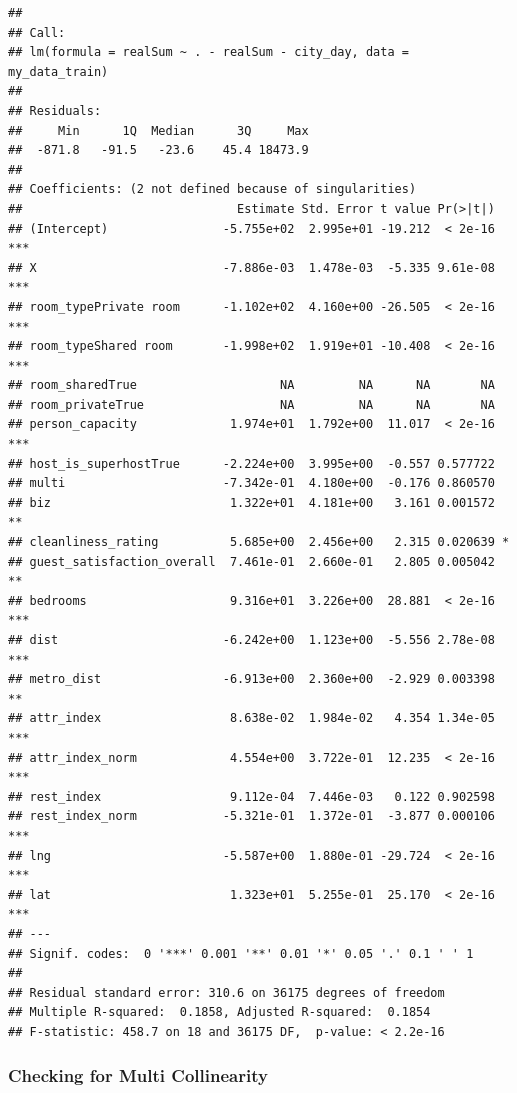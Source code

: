 \documentclass[
]{article}
\begin{document}
\begin{verbatim}
## 
## Call:
## lm(formula = realSum ~ . - realSum - city_day, data = my_data_train)
## 
## Residuals:
##     Min      1Q  Median      3Q     Max 
##  -871.8   -91.5   -23.6    45.4 18473.9 
## 
## Coefficients: (2 not defined because of singularities)
##                              Estimate Std. Error t value Pr(>|t|)    
## (Intercept)                -5.755e+02  2.995e+01 -19.212  < 2e-16 ***
## X                          -7.886e-03  1.478e-03  -5.335 9.61e-08 ***
## room_typePrivate room      -1.102e+02  4.160e+00 -26.505  < 2e-16 ***
## room_typeShared room       -1.998e+02  1.919e+01 -10.408  < 2e-16 ***
## room_sharedTrue                    NA         NA      NA       NA    
## room_privateTrue                   NA         NA      NA       NA    
## person_capacity             1.974e+01  1.792e+00  11.017  < 2e-16 ***
## host_is_superhostTrue      -2.224e+00  3.995e+00  -0.557 0.577722    
## multi                      -7.342e-01  4.180e+00  -0.176 0.860570    
## biz                         1.322e+01  4.181e+00   3.161 0.001572 ** 
## cleanliness_rating          5.685e+00  2.456e+00   2.315 0.020639 *  
## guest_satisfaction_overall  7.461e-01  2.660e-01   2.805 0.005042 ** 
## bedrooms                    9.316e+01  3.226e+00  28.881  < 2e-16 ***
## dist                       -6.242e+00  1.123e+00  -5.556 2.78e-08 ***
## metro_dist                 -6.913e+00  2.360e+00  -2.929 0.003398 ** 
## attr_index                  8.638e-02  1.984e-02   4.354 1.34e-05 ***
## attr_index_norm             4.554e+00  3.722e-01  12.235  < 2e-16 ***
## rest_index                  9.112e-04  7.446e-03   0.122 0.902598    
## rest_index_norm            -5.321e-01  1.372e-01  -3.877 0.000106 ***
## lng                        -5.587e+00  1.880e-01 -29.724  < 2e-16 ***
## lat                         1.323e+01  5.255e-01  25.170  < 2e-16 ***
## ---
## Signif. codes:  0 '***' 0.001 '**' 0.01 '*' 0.05 '.' 0.1 ' ' 1
## 
## Residual standard error: 310.6 on 36175 degrees of freedom
## Multiple R-squared:  0.1858, Adjusted R-squared:  0.1854 
## F-statistic: 458.7 on 18 and 36175 DF,  p-value: < 2.2e-16
\end{verbatim}

\hypertarget{checking-for-multi-collinearity}{%
\subsubsection{Checking for Multi
Collinearity}\label{checking-for-multi-collinearity}}
\end{document}
